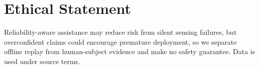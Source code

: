 \documentclass[letterpaper]{article} %
\begin{document}
\section{Ethical Statement}
Reliability-aware assistance may reduce risk from silent sensing failures, but overconfident claims could encourage premature deployment, so we separate offline replay from human-subject evidence and make no safety guarantee. Data is used under source terms.



\end{document}
